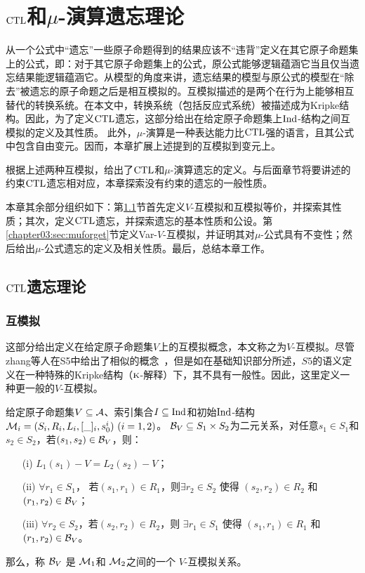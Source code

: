 
\chapter{$\textrm{CTL}$和$\mu$-演算遗忘理论}
\label{chapter03}
{\em 

从一个公式中“遗忘”一些原子命题得到的结果应该不“违背”定义在其它原子命题集上的公式，即：对于其它原子命题集上的公式，原公式能够逻辑蕴涵它当且仅当遗忘结果能逻辑蕴涵它。从模型的角度来讲，遗忘结果的模型与原公式的模型在“除去”被遗忘的原子命题之后是相互模拟的。互模拟描述的是两个在行为上能够相互替代的转换系统\cite{Baier:PMC:2008}。在本文中，转换系统（包括反应式系统）被描述成为Kripke结构。因此，为了定义$\textrm{CTL}$遗忘，这部分给出在给定原子命题集上$\textrm{Ind}$-结构之间互模拟的定义及其性质。
此外，$\mu$-演算是一种表达能力比$\textrm{CTL}$强的语言，且其公式中包含自由变元。因而，本章扩展上述提到的互模拟到变元上。

根据上述两种互模拟，给出了$\textrm{CTL}$和$\mu$-演算遗忘的定义。与后面章节将要讲述的约束$\textrm{CTL}$遗忘相对应，本章探索没有约束的遗忘的一般性质。

本章其余部分组织如下：第\ref{chapter03:sec:ctlforget}节首先定义$V$-互模拟和互模拟等价，并探索其性质；其次，定义$\textrm{CTL}$遗忘，并探索遗忘的基本性质和公设。第\ref{chapter03:sec:muforget}节定义Var-$V$-互模拟，并证明其对$\mu$-公式具有不变性；然后给出$\mu$-公式遗忘的定义及相关性质。最后，总结本章工作。}

\section{$\textrm{CTL}$遗忘理论}
\label{chapter03:sec:ctlforget}

\subsection{互模拟}
这部分给出定义在给定原子命题集$V$上的互模拟概念，本文称之为$V$-互模拟。尽管zhang等人在S5中给出了相似的概念~\cite{Yan:AIJ:2009}，但是如在基础知识部分所述，$S5$的语义定义在一种特殊的Kripke结构（$\textsc{k}$-解释）下，其不具有一般性。因此，这里定义一种更一般的$V$-互模拟。


\begin{definition}[$V$-互模拟]
	\label{def:VInd:bisimulation}
	给定原子命题集$V\subseteq\cal A$、索引集合$I\subseteq \textrm{Ind}$和初始$\textrm{Ind}$-结构 ${\cal M}_i=(S_i, R_i,L_i, [\_]_i, s_0^i)~(i=1,2)$。
	${\cal B}_V \subseteq S_1 \times S_2$为二元关系，对任意$s_1 \in S_1$和$s_2 \in S_2$，若$(s_1, s_2)\in {\cal B}_V$，则：
	\begin{itemize}
		\item[(i)] $L_1(s_1) - V = L_2(s_2) -V$；
		\item[(ii)] $\forall r_1\in S_1$， 若$(s_1, r_1)\in R_1$，则$\exists r_2 \in S_2$ 使得 $(s_2,r_2) \in R_2$ 和 $(r_1, r_2) \in {\cal B}_V$；
		\item[(iii)] $\forall r_2\in S_2$，若$(s_2, r_2)\in R_2$，则 $\exists r_1 \in S_1$ 使得 $(s_1,r_1) \in R_1$ 和 $(r_1, r_2)\in {\cal B}_V$。
	\end{itemize}
那么，称 ${\cal B}_V$ 是 ${\cal M}_1$和 ${\cal M}_2$之间的一个 $V$-互模拟关系。
\end{definition}


